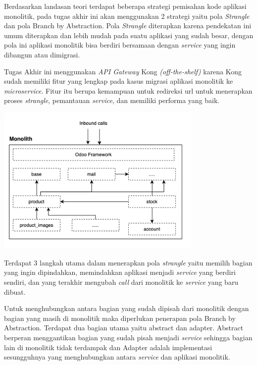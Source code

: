 Berdasarkan landasan teori terdapat beberapa strategi pemisahan kode aplikasi monolitik, pada tugas akhir ini akan menggunakan 2 strategi yaitu pola \textit{Strangle} dan pola Branch by Abstraction. Pola \textit{Strangle} diterapkan karena pendekatan ini umum diterapkan dan lebih mudah pada suatu aplikasi yang sudah besar, dengan pola ini aplikasi monolitik bisa berdiri bersamaan dengan \textit{service} yang ingin dibangun atau dimigrasi. 

Tugas Akhir ini menggunakan \textit{API Gateway} Kong \textit{(off-the-shelf)} karena Kong sudah memiliki fitur yang lengkap pada kasus migrasi aplikasi monolitik ke \textit{microservice}. Fitur itu berupa kemampuan untuk redireksi url untuk menerapkan proses \textit{strangle}, pemantauan \textit{service}, dan memiliki performa yang baik.

\begin{center}
	\includegraphics[width=10cm]{img/bab_3/strangelExMono.png}
	\label{fig:asd}
\end{center}

Terdapat 3 langkah utama dalam menerapkan pola \textit{strangle} yaitu memilih bagian yang ingin dipindahkan, memindahkan aplikasi menjadi \textit{service} yang berdiri sendiri, dan yang terakhir mengubah \textit{call} dari monolitik ke \textit{service} yang baru dibuat.
 
Untuk menghubungkan antara bagian yang sudah dipisah dari monolitik dengan bagian yang masih di monolitik maka diperlukan penerapan pola Branch by Abstraction. Terdapat dua bagian utama yaitu abstract dan adapter. Abstract berperan menggantikan bagian yang sudah pisah menjadi \textit{service} sehingga bagian lain di monolitik tidak terdampak dan Adapter adalah implementasi sesungguhnya yang menghubungkan antara \textit{service} dan aplikasi monolitik.


